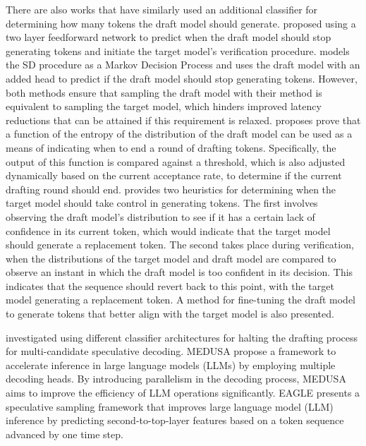\documentclass{article}
\theoremstyle{plain}
\theoremstyle{definition}
\theoremstyle{remark}
\begin{document}
There are also works that have similarly used an additional classifier for determining how many tokens the draft model should generate. \cite{mamou2024dynamicspeculationlookaheadaccelerates} proposed using a two layer feedforward network to predict when the draft model should stop generating tokens and initiate the target model's verification procedure. \cite{huang2024specdec++} models the SD procedure as a Markov Decision Process and uses the draft model with an added head to predict if the draft model should stop generating tokens. However, both methods ensure that sampling the draft model with their method is equivalent to sampling the target model, which hinders improved latency reductions that can be attained if this requirement is relaxed.  \cite{agrawal2024adaedl} proposes prove that a function of the entropy of the distribution of the draft model can be used as a means of indicating when to end a round of drafting tokens. Specifically, the output of this function is compared against a threshold, which is also adjusted dynamically based on the current acceptance rate, to determine if the current drafting round should end. \cite{kim2024speculative} provides two heuristics for determining when the target model should take control in generating tokens. The first involves observing the draft model's distribution to see if it has a certain lack of confidence in its current token, which would indicate that the target model should generate a replacement token. The second takes place during verification, when the distributions of the target model and draft model are compared to observe an instant in which the draft model is too confident in its decision. This indicates that the sequence should revert back to this point, with the target model generating a replacement token. A method for fine-tuning the draft model to generate tokens that better align with the target model is also presented. 


\cite{lu2024improving} investigated using different classifier architectures for halting the drafting process for multi-candidate speculative decoding. MEDUSA \cite{cai2024medusa} propose a framework to accelerate inference in large language models (LLMs) by employing multiple decoding heads. By introducing parallelism in the decoding process, MEDUSA aims to improve the efficiency of LLM operations significantly.
EAGLE \cite{li2024eagle} presents a speculative sampling framework that improves large language model (LLM) inference by predicting second-to-top-layer features based on a token sequence advanced by one time step.
\end{document}
